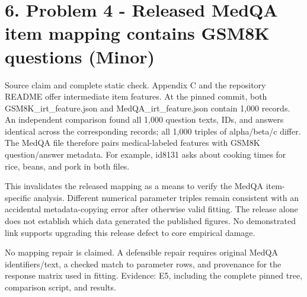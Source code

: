 \documentclass[10pt]{article}
\begin{document}
\section*{6. Problem 4 - Released MedQA item mapping contains GSM8K questions (Minor)}
Source claim and complete static check. Appendix C and the repository README offer intermediate item features. At the pinned commit, both GSM8K\_irt\_feature.json and MedQA\_irt\_feature.json contain 1,000 records. An independent comparison found all 1,000 question texts, IDs, and answers identical across the corresponding records; all 1,000 triples of alpha/beta/c differ. The MedQA file therefore pairs medical-labeled features with GSM8K question/answer metadata. For example, id8131 asks about cooking times for rice, beans, and pork in both files.\par
This invalidates the released mapping as a means to verify the MedQA item-specific analysis. Different numerical parameter triples remain consistent with an accidental metadata-copying error after otherwise valid fitting. The release alone does not establish which data generated the published figures. No demonstrated link supports upgrading this release defect to core empirical damage.\par
No mapping repair is claimed. A defensible repair requires original MedQA identifiers/text, a checked match to parameter rows, and provenance for the response matrix used in fitting. Evidence: E5, including the complete pinned tree, comparison script, and results.\par
\end{document}
